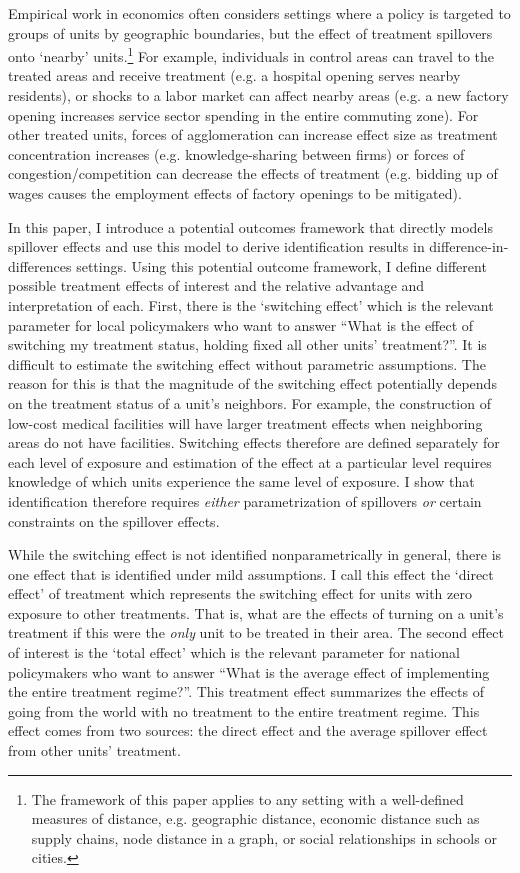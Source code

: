 \documentclass[11pt]{article}
\begin{document}
Empirical work in economics often considers settings where a policy is targeted to groups of units by geographic boundaries, but the effect of treatment spillovers onto `nearby' units.\footnote{The framework of this paper applies to any setting with a well-defined measures of distance, e.g. geographic distance, economic distance such as supply chains, node distance in a graph, or social relationships in schools or cities.} For example, individuals in control areas can travel to the treated areas and receive treatment (e.g. a hospital opening serves nearby residents), or shocks to a labor market can affect nearby areas (e.g. a new factory opening increases service sector spending in the entire commuting zone). For other treated units, forces of agglomeration can increase effect size as treatment concentration increases (e.g. knowledge-sharing between firms) or forces of congestion/competition can decrease the effects of treatment (e.g. bidding up of wages causes the employment effects of factory openings to be mitigated). 

In this paper, I introduce a potential outcomes framework that directly models spillover effects and use this model to derive identification results in difference-in-differences settings. Using this potential outcome framework, I define different possible treatment effects of interest and the relative advantage and interpretation of each. First, there is the `switching effect' which is the relevant parameter for local policymakers who want to answer ``What is the effect of switching my treatment status, holding fixed all other units' treatment?''. It is difficult to estimate the switching effect without parametric assumptions. The reason for this is that the magnitude of the switching effect potentially depends on the treatment status of a unit's neighbors. For example, the construction of low-cost medical facilities will have larger treatment effects when neighboring areas do not have facilities. Switching effects therefore are defined separately for each level of exposure and estimation of the effect at a particular level requires knowledge of which units experience the same level of exposure. I show that identification therefore requires \emph{either} parametrization of spillovers \emph{or} certain constraints on the spillover effects. 

While the switching effect is not identified nonparametrically in general, there is one effect that is identified under mild assumptions. I call this effect the `direct effect' of treatment which represents the switching effect for units with zero exposure to other treatments. That is, what are the effects of turning on a unit's treatment if this were the \emph{only} unit to be treated in their area. The second effect of interest is the `total effect' which is the relevant parameter for national policymakers who want to answer ``What is the average effect of implementing the entire treatment regime?''. This treatment effect summarizes the effects of going from the world with no treatment to the entire treatment regime. This effect comes from two sources: the direct effect and the average spillover effect from other units' treatment. 
\end{document}
